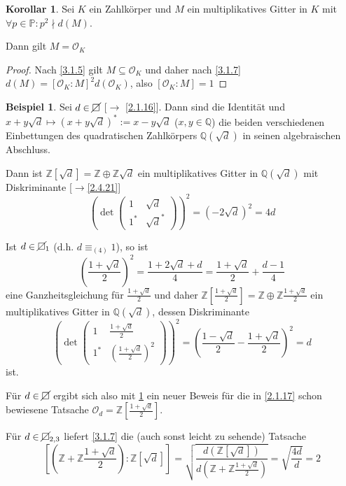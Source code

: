 \documentclass[
twoside=semi,
fontsize=12,
DIV=12, 
cleardoublepage=current,
leqno,
headings=optiontoheadandtoc, 
toc=idx
]{scrbook}
\newcommand{\Z}{\mathbb{Z}}
\newcommand{\Q}{\mathbb{Q}}
\renewcommand{\P}{\mathbb{P}}
\newcommand{\nsquare}{\cancel{\square}}
\newcommand{\brac}[1]{\left( #1 \right)}
\theoremstyle{definition}
\newtheorem{beispiel}[definition]{Beispiel}
\newtheorem{korollar}[definition]{Korollar}
\begin{document}
	\begin{korollar}\label{3.1.8}\hfill\newline
		Sei $K$ ein Zahlk\"orper und $M$ ein multiplikatives Gitter in $K$ mit $\forall p \in \P: p^2 \nmid d(M)$.
		
		\medskip\noindent
		Dann gilt $M = \mathcal{O}_K$
		
		\begin{proof}
			Nach \ref{3.1.5} gilt $M \subseteq \mathcal{O}_K$ und daher nach \ref{3.1.7} $d(M) = [\mathcal{O}_K:M]^2d(\mathcal{O}_K)$, 
			also $[\mathcal{O}_K:M] = 1$
		\end{proof}
	\end{korollar}

	\begin{beispiel}\label{3.1.9}\hfill\newline
		Sei $d \in \nsquare$ [$\to$ \ref{2.1.16}]. Dann sind die Identit\"at und $x+y\sqrt{d} \mapsto (x+y\sqrt{d})^* := x- y \sqrt{d}$ ($x,y \in \Q$) die beiden verschiedenen
		Einbettungen des quadratischen Zahlk\"orpers $\Q(\sqrt{d})$ in seinen algebraischen Abschluss.
		
		\medskip\noindent
		Dann ist $\Z[\sqrt{d}] = \Z \oplus \Z\sqrt{d}$ ein multiplikatives Gitter in $\Q(\sqrt{d})$ mit Diskriminante [$\to$\ref{2.4.21}]
		\[\brac{\det \begin{pmatrix}
				1 & \sqrt{d}\\1^* & \sqrt{d}^*
		\end{pmatrix}}^2 = (-2\sqrt{d})^2 = 4d\]
	
		Ist $d \in \nsquare_1$ (d.h. $d \equiv_{(4)} 1$), so ist 	
			\[\brac{\frac{1+\sqrt{d}}{2}}^2 = \frac{1+2\sqrt{d} + d}{4} = \frac{1+\sqrt{d}}{2} + \frac{d-1}{4}\]
		eine Ganzheitsgleichung f\"ur $\frac{1+\sqrt{d}}{2}$ und daher $\Z[\frac{1+\sqrt{d}}{2}] = \Z \oplus \Z\frac{1+\sqrt{d}}{2}$
		ein multiplikatives Gitter in $\Q(\sqrt{d})$, dessen Diskriminante 
		\[\brac{\det \begin{pmatrix}
				1 & \frac{1+\sqrt{d}}{2} \\ 1^* & \brac{\frac{1+\sqrt{d}}{2}}^2
		\end{pmatrix}}^2 = \brac{\frac{1-\sqrt{d}}{2} - \frac{1+\sqrt{d}  }{2}  }^2 = d\]
		ist.
		
		F\"ur $d \in \nsquare$ ergibt sich also mit \ref{3.1.8} ein neuer Beweis f\"ur die in \ref{2.1.17} schon bewiesene Tatsache
		$\mathcal{O}_d = \Z[\frac{1+\sqrt{d}}{2}]$.
		
		F\"ur $d \in \nsquare_{2,3}$ liefert \ref{3.1.7} die (auch sonst leicht zu sehende) Tatsache 
		\[\left[\brac{\Z+\Z\frac{1+\sqrt{d}}{2}}: \Z[\sqrt{d}]\right] = \sqrt{\frac{d(\Z[\sqrt{d}])}{d(\Z + \Z\frac{1+\sqrt{d}}{2})}} = \sqrt{\frac{4d}{d}} = 2\]
	\end{beispiel}
	\newpage
	
\end{document}
